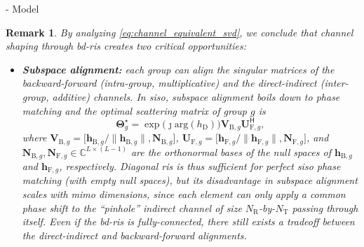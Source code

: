 \documentclass[journal]{IEEEtran}
\newtheorem{remark}{Remark}
\begin{document}
\begin{section}{- Model}
	\begin{remark}
		By analyzing \eqref{eq:channel_equivalent_svd}, we conclude that channel shaping through \gls{bd}-\gls{ris} creates two critical opportunities:
		\begin{itemize}
			\item \textbf{Subspace alignment:} each group can align the singular matrices of the backward-forward (intra-group, multiplicative) and the direct-indirect (inter-group, additive) channels. In \gls{siso}, subspace alignment boils down to phase matching and the optimal scattering matrix of group $g$ is
			\begin{equation}
				\mathbf{\Theta}_g^\star = \exp \bigl(\jmath \mathrm{arg}(h_\mathrm{D})\bigr) \mathbf{V}_{\mathrm{B},g} \mathbf{U}_{\mathrm{F},g}^\mathsf{H},
			\end{equation}
			where $\mathbf{V}_{\mathrm{B},g} = \bigl[\mathbf{h}_{\mathrm{B},g}/\lVert \mathbf{h}_{\mathrm{B},g} \rVert, \mathbf{N}_{\mathrm{B},g}\bigr]$, $\mathbf{U}_{\mathrm{F},g} = \bigl[\mathbf{h}_{\mathrm{F},g}/\lVert \mathbf{h}_{\mathrm{F},g} \rVert, \mathbf{N}_{\mathrm{F},g}\bigr]$, and $\mathbf{N}_{\mathrm{B},g}, \mathbf{N}_{\mathrm{F},g} \in \mathbb{C}^{L \times (L-1)}$ are the orthonormal bases of the null spaces of $\mathbf{h}_{\mathrm{B},g}$ and $\mathbf{h}_{\mathrm{F},g}$, respectively.
			Diagonal \gls{ris} is thus sufficient for perfect \gls{siso} phase matching (with empty null spaces), but its disadvantage in subspace alignment scales with \gls{mimo} dimensions, since each element can only apply a common phase shift to the ``pinhole'' indirect channel of size $N_\mathrm{R}$-by-$N_\mathrm{T}$ passing through itself.
			Even if the \gls{bd}-\gls{ris} is fully-connected, there still exists a tradeoff between the direct-indirect and backward-forward alignments.

\end{itemize}
\end{remark}
\end{section}
\end{document}
